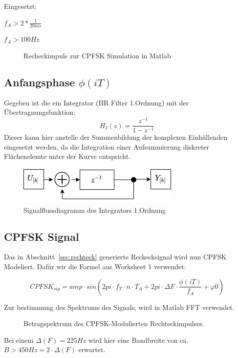 \documentclass{article}
\begin{document}
Eingesetzt:
\begin{center}
$f_A > 2*\frac{1}{20ms}$
\end{center}
\begin{center}
$f_A > 100Hz$   
\end{center}
\begin{figure}[!h]
    \centering
    \def\svgscale{0.3}
    \def\svgwidth{\columnwidth}
    
    \caption{Recheckimpuls zur \ac{CPFSK} Simulation in Matlab}
\end{figure}

\subsection{Anfangsphase $\phi(iT)$}

Gegeben ist die ein Integrator (IIR Filter 1.Ordnung) mit der Übertragnungsfunktion:
$$
H_I(z)=\frac{z^{-1}}{1-z^{-1}}
$$
Dieser kann hier anstelle der Summenbildung der komplexen Einhüllenden eingesetzt werden, 
da die Integration einer Aufsummierung diskreter Flächenelemte unter der Kurve entspricht.

\begin{figure}[!h]
    \centering
    \def\svgscale{0.3}
    \includegraphics{img/sig_IIR.png}
    \caption{Signalflussdiagramm des Integrators 1.Ordnung}
\end{figure}

\subsection{CPFSK Signal}
Das in Abschnitt~\ref{sec:rechteck} generierte Reckecksignal wird nun CPFSK Modeliert.
Dafür wir die Formel aus Worksheet 1 verwendet:

$$CPFSK_{sig} = amp \cdot  sin(2  pi \cdot f_T \cdot n \cdot T_A + 2 pi \cdot \varDelta{F} \cdot \frac{\phi (iT)}{f_A} + \varphi{0}) $$

Zur bestimmung des Spektrums des Signals, wird in Matlab FFT verwendet.
\begin{figure}[!h]
    \centering
    \def\svgscale{0.3}
    \def\svgwidth{\columnwidth}
    
    \caption{Betragspektrum des CPFSK-Modulierten Rechteckimpulses.}
\end{figure}
Bei einem $\varDelta(F) = 225Hz$ wird hier eine Bandbreite von ca. $B > 450Hz = 2\cdot \varDelta(F) $ erwartet.
\end{document}
